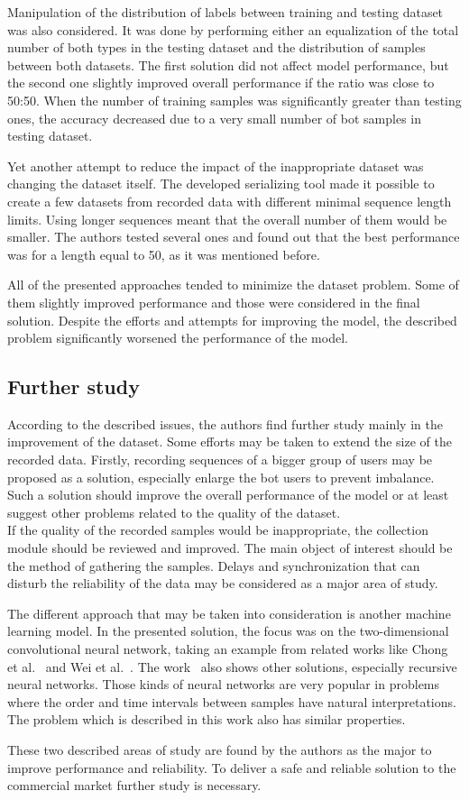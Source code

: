 Manipulation of the distribution of labels between training and testing dataset was also considered.
It was done by performing either an equalization of the total number of both types in the testing dataset and the distribution of samples between both datasets.
The first solution did not affect model performance, but the second one slightly improved overall performance if the ratio was close to 50:50.
When the number of training samples was significantly greater than testing ones, the accuracy decreased due to a very small number of bot samples in testing dataset.

Yet another attempt to reduce the impact of the inappropriate dataset was changing the dataset itself.
The developed serializing tool made it possible to create a few datasets from recorded data with different minimal sequence length limits.
Using longer sequences meant that the overall number of them would be smaller.
The authors tested several ones and found out that the best performance was for a length equal to 50, as it was mentioned before.

All of the presented approaches tended to minimize the dataset problem.
Some of them slightly improved performance and those were considered in the final solution.
Despite the efforts and attempts for improving the model, the described problem significantly worsened the performance of the model.

\subsection{Further study}\label{subsec:further-study}
According to the described issues, the authors find further study mainly in the improvement of the dataset.
Some efforts may be taken to extend the size of the recorded data.
Firstly, recording sequences of a bigger group of users may be proposed as a solution, especially enlarge the bot users to prevent imbalance.
Such a solution should improve the overall performance of the model or at least suggest other problems related to the quality of the dataset.\\
If the quality of the recorded samples would be inappropriate, the collection module should be reviewed and improved.
The main object of interest should be the method of gathering the samples.
Delays and synchronization that can disturb the reliability of the data may be considered as a major area of study.

The different approach that may be taken into consideration is another machine learning model.
In the presented solution, the focus was on the two-dimensional convolutional neural network, taking an example from related works like Chong et al.~\cite{Main} and Wei et al.~\cite{a-deep-learning-approach-to-web-bot-detection-using-mouse-behavioral-biometrics}.
The work~\cite{Main} also shows other solutions, especially recursive neural networks.
Those kinds of neural networks are very popular in problems where the order and time intervals between samples have natural interpretations.
The problem which is described in this work also has similar properties.

These two described areas of study are found by the authors as the major to improve performance and reliability.
To deliver a safe and reliable solution to the commercial market further study is necessary.
